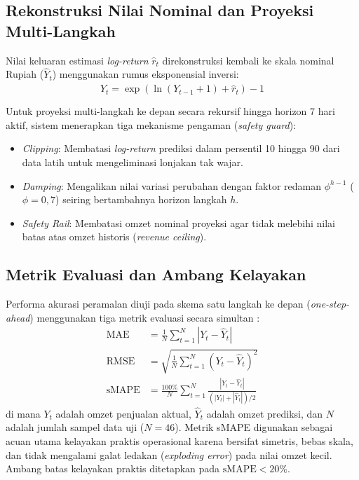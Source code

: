 \documentclass[10pt,a4paper]{article}
\begin{document}
\subsection{Rekonstruksi Nilai Nominal dan Proyeksi Multi-Langkah}
Nilai keluaran estimasi \textit{log-return} $\hat{r}_t$ direkonstruksi kembali ke skala nominal Rupiah ($\hat{Y}_t$) menggunakan rumus eksponensial inversi:
\begin{equation}
  \hat{Y}_t = \exp\left(\ln(Y_{t-1} + 1) + \hat{r}_t\right) - 1
  \label{eq:rekonstruksi}
\end{equation}

Untuk proyeksi multi-langkah ke depan secara rekursif hingga horizon 7 hari aktif, sistem menerapkan tiga mekanisme pengaman (\textit{safety guard}):
\begin{itemize}
  \item \textit{Clipping}: Membatasi \textit{log-return} prediksi dalam persentil 10 hingga 90 dari data latih untuk mengeliminasi lonjakan tak wajar.
  \item \textit{Damping}: Mengalikan nilai variasi perubahan dengan faktor redaman $\phi^{h-1}$ ($\phi = 0,7$) seiring bertambahnya horizon langkah $h$.
  \item \textit{Safety Rail}: Membatasi omzet nominal proyeksi agar tidak melebihi nilai batas atas omzet historis (\textit{revenue ceiling}).
\end{itemize}

\subsection{Metrik Evaluasi dan Ambang Kelayakan}
Performa akurasi peramalan diuji pada skema satu langkah ke depan (\textit{one-step-ahead}) menggunakan tiga metrik evaluasi secara simultan \cite{hyndman2006, hodson2022}:
\begin{align}
  \text{MAE} &= \frac{1}{N} \sum_{t=1}^N \left| Y_t - \hat{Y}_t \right| \label{eq:mae} \\
  \text{RMSE} &= \sqrt{\frac{1}{N} \sum_{t=1}^N \left( Y_t - \hat{Y}_t \right)^2} \label{eq:rmse} \\
  \text{sMAPE} &= \frac{100\%}{N} \sum_{t=1}^N \frac{\left| Y_t - \hat{Y}_t \right|}{\left( \left| Y_t \right| + \left| \hat{Y}_t \right| \right) / 2} \label{eq:smape}
\end{align}
di mana $Y_t$ adalah omzet penjualan aktual, $\hat{Y}_t$ adalah omzet prediksi, dan $N$ adalah jumlah sampel data uji ($N=46$). Metrik sMAPE digunakan sebagai acuan utama kelayakan praktis operasional karena bersifat simetris, bebas skala, dan tidak mengalami galat ledakan (\textit{exploding error}) pada nilai omzet kecil. Ambang batas kelayakan praktis ditetapkan pada $\text{sMAPE} < 20\%$.
\end{document}
